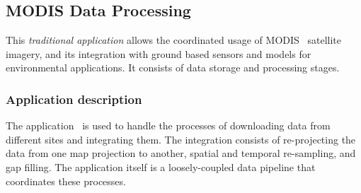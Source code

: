 

\subsection{MODIS Data Processing \label{modisKeith}}

%




This {\em traditional application} allows the coordinated usage of MODIS~\cite{modis}
satellite imagery, and its integration with ground based sensors and models for
environmental applications.  It consists of data storage and processing stages.

\subsubsection*{Application description}


The application~\cite{modisAzure, modis:ipdps:2010} is used to handle the processes of downloading data from different
sites and integrating them. The integration consists of re-projecting the data from one map projection to another,
spatial and temporal re-sampling, and gap filling. The application itself is a loosely-coupled data
pipeline that coordinates these processes.

